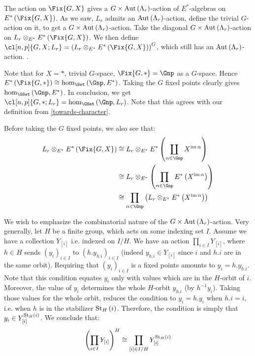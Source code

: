 The action on $\Fix{G,X}$ gives a $G \times \operatorname{Aut} \left(\Lambda_r\right)$-action of $E^*$-algebras on $E^*\left(\Fix{G,X}\right)$.
As we saw, $L_r$ admits an $\operatorname{Aut} \left(\Lambda_r\right)$-action, define the trivial $G$-action on it, to get a $G \times \operatorname{Aut} \left(\Lambda_r\right)$-action.
Take the diagonal $G \times \operatorname{Aut} \left(\Lambda_r\right)$-action on $L_r \otimes_{E^*} E^*\left(\Fix{G,X}\right)$.
We then define $\cl[n,p]{G,X; L_r} = \left(L_r \otimes_{E^*} E^*\left(\Fix{G,X}\right)\right)^G$, which still has an $\operatorname{Aut} \left(\Lambda_r\right)$-action.
.

Note that for $X = *$, trivial $G$-space, $\Fix{G,*} = \Gnp$ as a $G$-space.
Hence $E^*\left(\Fix{G,*}\right) \cong \hom_{\Set}\left(\Gnp, E^*\right)$.
Taking the $G$ fixed points clearly gives $\hom_{\GSet}\left(\Gnp, E^*\right)$.
In conclusion, we get $\cl[n,p]{G,*; L_r} =  \hom_{\GSet}\left(\Gnp, L_r\right)$.
Note that this agrees with our definition from \ref{towards-character}.

Before taking the $G$ fixed points, we also see that:
\begin{align}
	L_r \otimes_{E^*} E^*\left(\Fix{G,X}\right)
	&\cong L_r \otimes_{E^*} E^*\left(\coprod_{\alpha \in \Gnp} X^{\im \alpha}\right)\nonumber\\
	&\cong L_r \otimes_{E^*} \left(\prod_{\alpha \in \Gnp} E^*\left(X^{\im \alpha}\right)\right)\\
	&\cong \prod_{\alpha \in \Gnp} \left(L_r \otimes_{E^*} E^*\left(X^{\im \alpha}\right)\right)\label{Lr-Fix}
\end{align}

We wish to emphasize the combinatorial nature of the $G \times \operatorname{Aut} \left(\Lambda_r\right)$-action.
Very generally, let $H$ be a finite group, which acts on some indexing set $I$.
Assume we have a collection $Y_{\left[i\right]}$ i.e. indexed on $I/H$.
We have an action $\prod_{i \in I} Y_{\left[i\right]}$, where $h \in H$ sends $\left(y_i\right)_{i \in I}$ to $\left(h.y_{h.i}\right)_{i \in I}$ (indeed $y_{h.i} \in Y_{\left[i\right]}$ since $i$ and $h.i$ are in the same orbit).
Requiring that $\left(y_i\right)_{i \in I}$ is a fixed points amounts to $y_i = h.y_{h.i}$.
Note that this condition equates $y_i$ only with values which are in the $H$-orbit of $i$.
Moreover, the value of $y_i$ determines the whole $H$-orbit $y_{h.i}$ (by $h^{-1} y_i$).
Taking those values for the whole orbit, reduces the condition to $y_i = h. y_i$ when $h.i = i$, i.e. when $h$ is in the stabilizer $\operatorname{St}_H\left(i\right)$.
Therefore, the condition is simply that $y_i \in Y_{\left[i\right]}^{\operatorname{St}_H\left(i\right)}$.
We conclude that:
\begin{equation}\label{combinatorial-situation}
	\left(\prod_{i \in I} Y_{\left[i\right]}\right)^H
	\cong \prod_{\left[i\right] \in I/H} Y_{\left[i\right]}^{\operatorname{St}_H\left(i\right)}
\end{equation}

